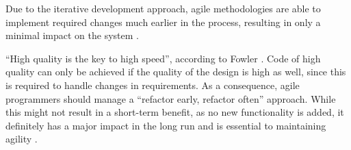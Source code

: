 Due to the iterative development approach, agile methodologies are able to implement required changes much earlier in the process, resulting in only a minimal impact on the system \cite{martin2014}. 

``High quality is the key to high speed'', according to Fowler \cite{martin2014}. Code of high quality can only be achieved if the quality of the design is high as well, since this is required to handle changes in requirements. As a consequence, agile programmers should manage a ``refactor early, refactor often'' approach. While this might not result in a short-term benefit, as no new functionality is added, it definitely has a major impact in the long run and is essential to maintaining agility \cite{fowlerhighsmithagile}.
